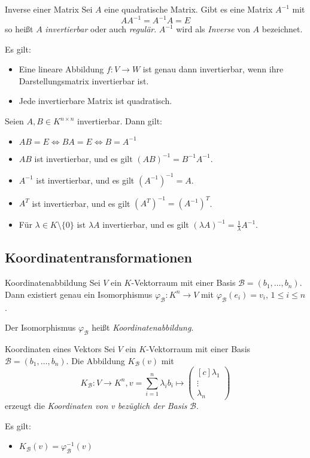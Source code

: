 \documentclass[german]{../spicker}
\newcommand{\vektor}[1]{\begin{pmatrix*}[c] #1 \end{pmatrix*}}
\begin{document}
\begin{defi}{Inverse einer Matrix}
    Sei $A$ eine quadratische Matrix.
    Gibt es eine Matrix $A^{-1}$ mit
    $$
        AA^{-1} = A^{-1}A = E
    $$
    so heißt $A$ \emph{invertierbar} oder auch \emph{regulär}.
    $A^{-1}$ wird als \emph{Inverse} von $A$ bezeichnet.

    Es gilt:
    \begin{itemize}
        \item Eine lineare Abbildung $f : V \to W$ ist genau dann invertierbar, wenn ihre Darstellungsmatrix invertierbar ist.
        \item Jede invertierbare Matrix ist quadratisch.
    \end{itemize}

    Seien $A, B \in K^{n\times n}$ invertierbar.
    Dann gilt:
    \begin{itemize}
        \item $AB = E \iff BA = E \iff B = A^{-1}$
        \item $AB$ ist invertierbar, und es gilt $(AB)^{-1} = B^{-1}A^{-1}$.
        \item $A^{-1}$ ist invertierbar, und es gilt $(A^{-1})^{-1} = A$.
        \item $A^T$ ist invertierbar, und es gilt $(A^T)^{-1} = (A^{-1})^T$.
        \item Für $\lambda \in K \setminus \{0\}$ ist $\lambda A$ invertierbar, und es gilt $(\lambda A)^{-1} = \frac{1}{\lambda}A^{-1}$.
    \end{itemize}
\end{defi}

\subsection{Koordinatentransformationen}

\begin{defi}{Koordinatenabbildung}
    Sei $V$ ein $K$-Vektorraum mit einer Basis $\mathcal{B} = (b_1, \ldots, b_n)$.
    Dann existiert genau ein Isomorphismus $\varphi_{\mathcal{B}} : K^n \to V$ mit $\varphi_{\mathcal{B}}(e_i) = v_i$, $1 \leq i \leq n$.

    Der Isomorphismus $\varphi_{\mathcal{B}}$ heißt \emph{Koordinatenabbildung}.
\end{defi}

\begin{defi}{Koordinaten eines Vektors}
    Sei $V$ ein $K$-Vektorraum mit einer Basis $\mathcal{B} = (b_1, \ldots, b_n)$.
    Die Abbildung $K_{\mathcal{B}}(v)$ mit
    $$
        K_{\mathcal{B}} : V \to K^n , v = \sum^n_{i=1} \lambda_ib_i \longmapsto \vektor{\lambda_1 \\ \vdots \\ \lambda_n}
    $$
    erzeugt die \emph{Koordinaten von v bezüglich der Basis} $\mathcal{B}$.

    Es gilt:
    \begin{itemize}
        \item $K_{\mathcal{B}}(v) = \varphi^{-1}_{\mathcal{B}}(v)$
    \end{itemize}
\end{defi}
\end{document}
